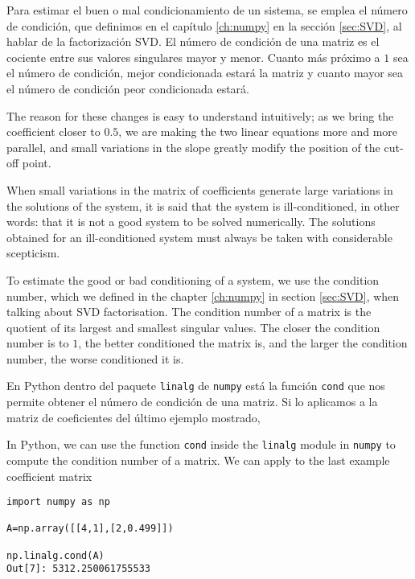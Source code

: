 \begin{paracol}{2}
Para estimar el buen o mal condicionamiento de un sistema, se emplea el número de condición, que definimos en el capítulo \ref{ch:numpy} en la sección \ref{sec:SVD}, al hablar de la factorización SVD. El número de condición de una matriz es el cociente entre sus valores singulares mayor y menor.  Cuanto más próximo a $1$ sea el número de condición, mejor condicionada estará la matriz y cuanto mayor sea el número de condición peor condicionada estará.

\switchcolumn
The reason for these changes is easy to understand intuitively; as we bring the coefficient closer to $0.5$, we are making the two linear equations more and more parallel, and small variations in the slope greatly modify the position of the cut-off point.

When small variations in the matrix of coefficients generate large variations in the solutions of the system, it is said that the system is ill-conditioned, in other words: that it is not a good system to be solved numerically. The solutions obtained for an ill-conditioned system must always be taken with considerable scepticism.

To estimate the good or bad conditioning of a system, we use the condition number, which we defined in the chapter \ref{ch:numpy} in section \ref{sec:SVD}, when talking about SVD factorisation. The condition number of a matrix is the quotient of its largest and smallest singular values.  The closer the condition number is to $1$, the better conditioned the matrix is, and the larger the condition number, the worse conditioned it is.

\switchcolumn

En Python dentro del paquete \texttt{linalg} de \texttt{numpy} está la función \texttt{cond} que nos permite obtener el número de condición de una matriz. Si lo aplicamos a la matriz de coeficientes del último ejemplo mostrado,

\switchcolumn
In Python, we can use the function \texttt{cond} inside the \texttt{linalg} module in \texttt{numpy} to compute the condition number of a matrix. We can apply to the last example coefficient matrix

\end{paracol}

\begin{verbatim}
import numpy as np

A=np.array([[4,1],[2,0.499]])

np.linalg.cond(A)
Out[7]: 5312.250061755533
\end{verbatim}

